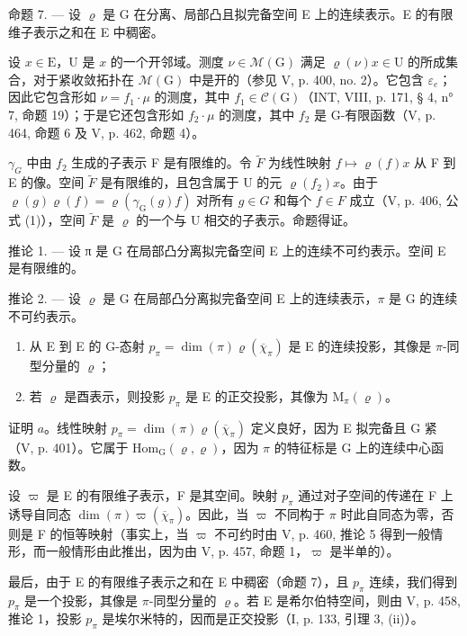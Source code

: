 命题 7. --- 设 \(\varrho\) 是 G 在分离、局部凸且拟完备空间 E 上的连续表示。E 的有限维子表示之和在 E 中稠密。

设 \(x \in \mathrm{E}\)，U 是 \(x\) 的一个开邻域。测度 \(\nu \in \mathcal{M}(\mathrm{G})\) 满足 \(\varrho(\nu)x \in \mathrm{U}\) 的所成集合，对于紧收敛拓扑在 \(\mathcal{M}(\mathrm{G})\) 中是开的（参见 V, p. 400, no. 2）。它包含 \(\varepsilon_e\)；因此它包含形如 \(\nu = f_1 \cdot \mu\) 的测度，其中 \(f_1 \in \mathcal{C}(\mathrm{G})\)（INT, VIII, p. 171, § 4, n° 7, 命题 19）；于是它还包含形如 \(f_2 \cdot \mu\) 的测度，其中 \(f_2\) 是 G-有限函数（V, p. 464, 命题 6 及 V, p. 462, 命题 4）。

\(\gamma_{G}\) 中由 \(f_{2}\) 生成的子表示 F 是有限维的。令 \(\widetilde{F}\) 为线性映射 \(f \mapsto \varrho(f)x\) 从 F 到 E 的像。空间 \(\widetilde{F}\) 是有限维的，且包含属于 U 的元 \(\varrho(f_{2})x\)。由于 \(\varrho(g)\varrho(f) = \varrho(\gamma_{\mathrm{G}}(g)f)\) 对所有 \(g \in G\) 和每个 \(f \in F\) 成立（V, p. 406, 公式 (1)），空间 \(\widetilde{F}\) 是 \(\varrho\) 的一个与 U 相交的子表示。命题得证。

推论 1. --- 设 π 是 G 在局部凸分离拟完备空间 E 上的连续不可约表示。空间 E 是有限维的。

推论 2. --- 设 \(\varrho\) 是 G 在局部凸分离拟完备空间 E 上的连续表示，\(\pi\) 是 G 的连续不可约表示。

\begin{enumerate}
\def\labelenumi{\alph{enumi})}
\item
  从 E 到 E 的 G-态射 \(p_{\pi} = \dim(\pi)\varrho(\overline{\chi}_{\pi})\) 是 E 的连续投影，其像是 \(\pi\)-同型分量的 \(\varrho\)；
\item
  若 \(\varrho\) 是酉表示，则投影 \(p_{\pi}\) 是 E 的正交投影，其像为 \(\mathrm{M}_{\pi}(\varrho)\)。
\end{enumerate}

证明 \(a\)。线性映射 \(p_{\pi} = \dim(\pi)\varrho(\overline{\chi}_{\pi})\) 定义良好，因为 E 拟完备且 G 紧（V, p. 401）。它属于 \(\mathrm{Hom}_{\mathrm{G}}(\varrho,\varrho)\)，因为 \(\pi\) 的特征标是 G 上的连续中心函数。

设 \(\varpi\) 是 E 的有限维子表示，F 是其空间。映射 \(p_{\pi}\) 通过对子空间的传递在 F 上诱导自同态 \(\dim(\pi)\varpi(\overline{\chi}_{\pi})\)。因此，当 \(\varpi\) 不同构于 \(\pi\) 时此自同态为零，否则是 F 的恒等映射（事实上，当 \(\varpi\) 不可约时由 V, p. 460, 推论 5 得到一般情形，而一般情形由此推出，因为由 V, p. 457, 命题 1，\(\varpi\) 是半单的）。

最后，由于 E 的有限维子表示之和在 E 中稠密（命题 7），且 \(p_{\pi}\) 连续，我们得到 \(p_{\pi}\) 是一个投影，其像是 \(\pi\)-同型分量的 \(\varrho\)。若 E 是希尔伯特空间，则由 V, p. 458, 推论 1，投影 \(p_{\pi}\) 是埃尔米特的，因而是正交投影（I, p. 133, 引理 3, (ii)）。

